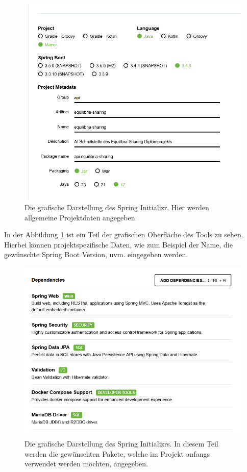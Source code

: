 \begin{figure}
	\centering
	\includegraphics[width=1\textwidth]{images/impl-spring-init-1.png}
	\caption{Die grafische Darstellung des Spring Initializr. Hier werden allgemeine Projektdaten angegeben. \textit{\cite{website-spring-initializr}}}
    \label{backend-spring-init-1}
\end{figure}

In der Abbildung \ref{backend-spring-init-1} ist ein Teil der grafischen Oberfläche des Tools zu sehen. Hierbei können projektspezifische Daten, wie zum Beispiel der Name, die gewünschte Spring Boot Version, uvm. eingegeben werden.

\begin{figure}
	\centering
	\includegraphics[width=1\textwidth]{images/impl-spring-init-2.png}
	\caption{Die grafische Darstellung des Spring Initializrs. In diesem Teil werden die gewünschten Pakete, welche im Projekt anfangs verwendet werden möchten, angegeben. \textit{\cite{website-spring-initializr}}}
    \label{backend-spring-init-2}
\end{figure}

